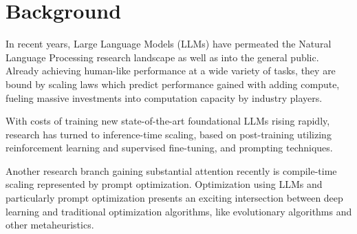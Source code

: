 \section{Background}
In recent years, Large Language Models (LLMs) have permeated the Natural Language Processing research landscape as well as into the general public. 
Already achieving human-like performance at a wide variety of tasks\cite{bubeck2023sparksartificialgeneralintelligence}, 
they are bound by scaling laws\cite{kaplan2020scalinglawsneurallanguage} which predict performance gained with adding compute, fueling
massive investments into computation capacity by industry players. 

With costs of training new state-of-the-art foundational LLMs rising rapidly, research has turned to inference-time scaling\cite{welleck2024decodingmetagenerationinferencetimealgorithms}, 
based on post-training\cite{openai2024openaio1card}\cite{deepseekai2025deepseekr1incentivizingreasoningcapability} utilizing reinforcement learning and supervised fine-tuning, and 
prompting techniques\cite{schulhoff2024promptreportsystematicsurvey}. 

Another research branch gaining substantial attention recently is compile-time scaling\cite{schnabel2024symbolicpromptprogramsearch} represented by prompt optimization\cite{ramnath2025systematicsurveyautomaticprompt}.
Optimization using LLMs\cite{meyerson2024languagemodelcrossovervariation}\cite{liu2024largelanguagemodelsevolutionary} and particularly prompt optimization\cite{yang2024largelanguagemodelsoptimizers}\cite{zhou2023largelanguagemodelshumanlevel}\cite{he2024crispomultiaspectcritiquesuggestionguidedautomatic} 
presents an exciting intersection between deep learning and traditional optimization algorithms, like evolutionary algorithms\cite{guo2024connectinglargelanguagemodels}\cite{cui2024phaseevounifiedincontextprompt}\cite{fernando2023promptbreederselfreferentialselfimprovementprompt} and other metaheuristics\cite{pan2024plumpromptlearningusing}.


